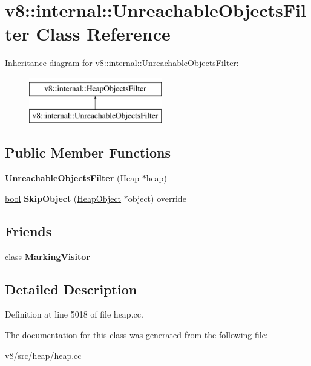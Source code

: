 \hypertarget{classv8_1_1internal_1_1UnreachableObjectsFilter}{}\section{v8\+:\+:internal\+:\+:Unreachable\+Objects\+Filter Class Reference}
\label{classv8_1_1internal_1_1UnreachableObjectsFilter}
Inheritance diagram for v8\+:\+:internal\+:\+:Unreachable\+Objects\+Filter\+:\begin{figure}[H]
\begin{center}
\leavevmode
\includegraphics[height=2.000000cm]{classv8_1_1internal_1_1UnreachableObjectsFilter}
\end{center}
\end{figure}
\subsection*{Public Member Functions}
\begin{DoxyCompactItemize}
\item 
\mbox{\label{classv8_1_1internal_1_1UnreachableObjectsFilter_aa41ea2a94721a16c89fba4d7a099d83b}} 
{\bfseries Unreachable\+Objects\+Filter} (\mbox{\hyperlink{classv8_1_1internal_1_1Heap}{Heap}} $\ast$heap)
\item 
\mbox{\label{classv8_1_1internal_1_1UnreachableObjectsFilter_a36ef807776c92a0d42447344454a2f65}} 
\mbox{\hyperlink{classbool}{bool}} {\bfseries Skip\+Object} (\mbox{\hyperlink{classv8_1_1internal_1_1HeapObject}{Heap\+Object}} $\ast$object) override
\end{DoxyCompactItemize}
\subsection*{Friends}
\begin{DoxyCompactItemize}
\item 
\mbox{\label{classv8_1_1internal_1_1UnreachableObjectsFilter_aa5f956fda2410280ba71af311ce66f19}} 
class {\bfseries Marking\+Visitor}
\end{DoxyCompactItemize}


\subsection{Detailed Description}


Definition at line 5018 of file heap.\+cc.



The documentation for this class was generated from the following file\+:\begin{DoxyCompactItemize}
\item 
v8/src/heap/heap.\+cc\end{DoxyCompactItemize}
